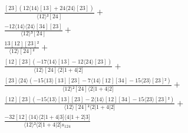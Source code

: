 \documentclass[varwidth, border=5pt]{standalone}
\begin{document}
\begin{my}
$\begin{gathered}
\scriptscriptstyle\frac{[23](12⟨14⟩[13]+24⟨24⟩[23])}{⟨12⟩²[24]} +\\
\scriptscriptstyle\frac{-12⟨14⟩⟨24⟩[34][23]}{⟨12⟩³[24]} +\\
\scriptscriptstyle\frac{13[12][23]²}{⟨12⟩[24]²} +\\
\scriptscriptstyle\frac{[12][23](-17⟨14⟩[13]-12⟨24⟩[23])}{⟨12⟩[24]⟨2|1+4|2]} +\\
\scriptscriptstyle\frac{[23]⟨24⟩(-15⟨13⟩[13][23]-7⟨14⟩[12][34]-15⟨23⟩[23]²)}{⟨12⟩²[24]⟨2|1+4|2]} +\\
\scriptscriptstyle\frac{[12][23](-15⟨13⟩[13][23]-2⟨14⟩[12][34]-15⟨23⟩[23]²)}{⟨12⟩[24]²⟨2|1+4|2]} +\\
\scriptscriptstyle\frac{-32[12]⟨14⟩⟨2|1+4|3]⟨4|1+2|3]}{⟨12⟩²⟨2|1+4|2]s_{124}} \phantom{+}
\end{gathered}$
\end{my}
\end{document}
